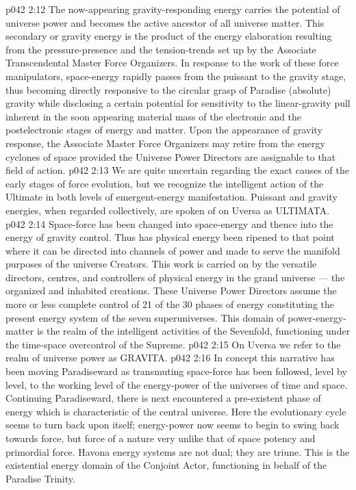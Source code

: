 \vs p042 2:12 \bibnobreakspace {} The now\hyp{}appearing gravity\hyp{}responding energy carries the potential of universe power and becomes the active ancestor of all universe matter. This secondary or gravity energy is the product of the energy elaboration resulting from the pressure\hyp{}presence and the tension\hyp{}trends set up by the Associate Transcendental Master Force Organizers. In response to the work of these force manipulators, space\hyp{}energy rapidly passes from the puissant to the gravity stage, thus becoming directly responsive to the circular grasp of Paradise (absolute) gravity while disclosing a certain potential for sensitivity to the linear\hyp{}gravity pull inherent in the soon appearing material mass of the electronic and the postelectronic stages of energy and matter. Upon the appearance of gravity response, the Associate Master Force Organizers may retire from the energy cyclones of space provided the Universe Power Directors are assignable to that field of action.
\vs p042 2:13 \pc We are quite uncertain regarding the exact causes of the early stages of force evolution, but we recognize the intelligent action of the Ultimate in both levels of emergent\hyp{}energy manifestation. Puissant and gravity energies, when regarded collectively, are spoken of on Uversa as ULTIMATA.
\vs p042 2:14 \bibnobreakspace {} Space\hyp{}force has been changed into space\hyp{}energy and thence into the energy of gravity control. Thus has physical energy been ripened to that point where it can be directed into channels of power and made to serve the manifold purposes of the universe Creators. This work is carried on by the versatile directors, centres, and controllers of physical energy in the grand universe --- the organized and inhabited creations. These Universe Power Directors assume the more or less complete control of 21 of the 30 phases of energy constituting the present energy system of the seven superuniverses. This domain of power\hyp{}energy\hyp{}matter is the realm of the intelligent activities of the Sevenfold, functioning under the time\hyp{}space overcontrol of the Supreme.
\vs p042 2:15 On Uversa we refer to the realm of universe power as GRAVITA.
\vs p042 2:16 \bibnobreakspace {} In concept this narrative has been moving Paradiseward as transmuting space\hyp{}force has been followed, level by level, to the working level of the energy\hyp{}power of the universes of time and space. Continuing Paradiseward, there is next encountered a pre\hyp{}existent phase of energy which is characteristic of the central universe. Here the evolutionary cycle seems to turn back upon itself; energy\hyp{}power now seems to begin to swing back towards force, but force of a nature very unlike that of space potency and primordial force. Havona energy systems are not dual; they are triune. This is the existential energy domain of the Conjoint Actor, functioning in behalf of the Paradise Trinity.

